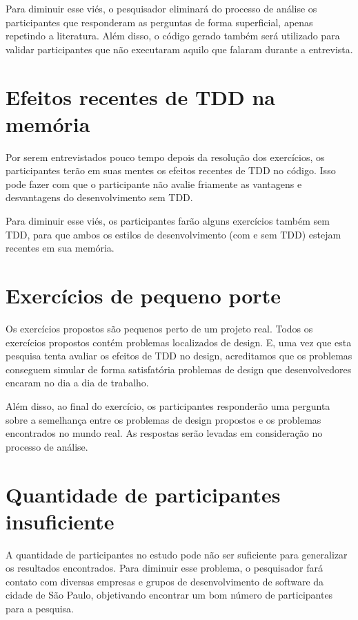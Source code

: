 Para diminuir esse viés, o pesquisador eliminará do processo de análise os participantes
que responderam as perguntas de forma superficial, apenas repetindo a literatura. Além disso,
o código gerado também será utilizado para validar participantes que não executaram aquilo que
falaram durante a entrevista.

\section{Efeitos recentes de TDD na memória}

Por serem entrevistados pouco tempo depois da resolução dos exercícios, os participantes terão
em suas mentes os efeitos recentes de TDD no código. Isso pode fazer com que o participante
não avalie friamente as vantagens e desvantagens do desenvolvimento sem TDD. 

Para diminuir esse viés, os participantes farão alguns exercícios também
sem TDD, para que ambos os estilos de desenvolvimento (com e sem TDD) estejam
recentes em sua memória.

\section{Exercícios de pequeno porte}

Os exercícios propostos são pequenos perto de um projeto real. Todos os exercícios propostos contém
problemas localizados de design. E, uma vez que esta pesquisa tenta avaliar os efeitos de TDD no design, 
acreditamos que os problemas conseguem simular de forma satisfatória
problemas de design que desenvolvedores encaram no dia a dia de trabalho.

Além disso, ao final do exercício, os participantes responderão uma pergunta sobre a semelhança
entre os problemas de design propostos e os problemas encontrados no mundo real.
As respostas serão levadas em consideração no processo de análise.

\section{Quantidade de participantes insuficiente}

A quantidade de participantes no estudo pode não ser suficiente para generalizar
os resultados encontrados. Para diminuir esse problema, o pesquisador fará contato
com diversas empresas e grupos de desenvolvimento de software da cidade de São Paulo,
objetivando encontrar um bom número de participantes para a pesquisa.

